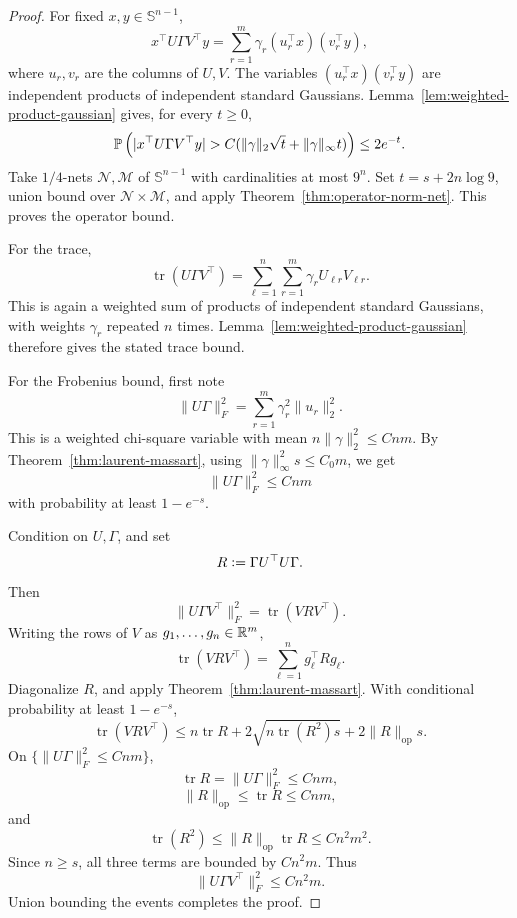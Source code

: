 \begin{proof}
For fixed \(x,y\in\mathbb S^{n-1}\),
\[
x^\top U\Gamma V^\top y
=
\sum_{r=1}^m \gamma_r (u_r^\top x)(v_r^\top y),
\]
where \(u_r,v_r\) are the columns of \(U,V\). The variables
\((u_r^\top x)(v_r^\top y)\) are independent products of independent standard
Gaussians. Lemma~\ref{lem:weighted-product-gaussian} gives, for every \(t\ge0\),
\[
\mathbb{P}\left(
|x^\top U\Gamma V^\top y|
>
C(\|\gamma\|_2\sqrt t+\|\gamma\|_\infty t)
\right)
\le
2e^{-t}.
\]
Take \(1/4\)-nets \(\mathcal N,\mathcal M\) of \(\mathbb S^{n-1}\) with cardinalities
at most \(9^n\). Set \(t=s+2n\log 9\), union bound over
\(\mathcal N\times\mathcal M\), and apply Theorem~\ref{thm:operator-norm-net}.
This proves the operator bound.

For the trace,
\[
\operatorname{tr}(U\Gamma V^\top)
=
\sum_{\ell=1}^n\sum_{r=1}^m\gamma_rU_{\ell r}V_{\ell r}.
\]
This is again a weighted sum of products of independent standard Gaussians, with
weights \(\gamma_r\) repeated \(n\) times. Lemma~\ref{lem:weighted-product-gaussian}
therefore gives the stated trace bound.

For the Frobenius bound, first note
\[
\|U\Gamma\|_F^2
=
\sum_{r=1}^m\gamma_r^2\|u_r\|_2^2.
\]
This is a weighted chi-square variable with mean \(n\|\gamma\|_2^2\le Cnm\). By
Theorem~\ref{thm:laurent-massart}, using
\(\|\gamma\|_\infty^2s\le C_0m\), we get
\[
\|U\Gamma\|_F^2\le Cnm
\]
with probability at least \(1-e^{-s}\).

Condition on \(U,\Gamma\), and set
\[
R\vcentcolon= \Gamma U^\top U\Gamma.
\]
Then
\[
\|U\Gamma V^\top\|_F^2
=
\operatorname{tr}(VRV^\top).
\]
Writing the rows of \(V\) as \(g_1,\dots,g_n\in\mathbb{R}^m\),
\[
\operatorname{tr}(VRV^\top)
=
\sum_{\ell=1}^n g_\ell^\top Rg_\ell.
\]
Diagonalize \(R\), and apply Theorem~\ref{thm:laurent-massart}. With conditional
probability at least \(1-e^{-s}\),
\[
\operatorname{tr}(VRV^\top)
\le
n\operatorname{tr}R
+2\sqrt{n\operatorname{tr}(R^2)s}
+2\|R\|_{\mathrm{op}}s.
\]
On \(\{\|U\Gamma\|_F^2\le Cnm\}\),
\[
\operatorname{tr}R=\|U\Gamma\|_F^2\le Cnm,
\]
\[
\|R\|_{\mathrm{op}}\le \operatorname{tr}R\le Cnm,
\]
and
\[
\operatorname{tr}(R^2)
\le
\|R\|_{\mathrm{op}}\operatorname{tr}R
\le
Cn^2m^2.
\]
Since \(n\ge s\), all three terms are bounded by \(Cn^2m\). Thus
\[
\|U\Gamma V^\top\|_F^2\le Cn^2m.
\]
Union bounding the events completes the proof.
\end{proof}

